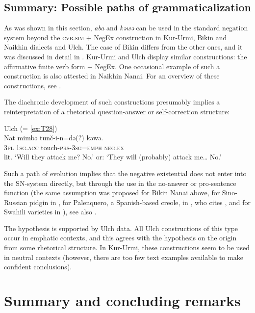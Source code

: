 \documentclass[output=paper,colorlinks,citecolor=brown]{langscibook}
\begin{document}
\subsection{Summary: Possible paths of grammaticalization}\label{sec:T6.5}

As was shown in this section, \textit{aba} and \textit{kəwə} can be used in the standard negation system beyond the \textsc{cvb.sim} + NegEx construction in Kur-Urmi, Bikin and Naikhin dialects and Ulch. The case of Bikin differs from the other ones, and it was discussed in detail in . Kur-Urmi and Ulch display similar constructions: the affirmative finite verb form + NegEx. One occasional example of such a construction is also attested in Naikhin Nanai. For an overview of these constructions, see .

The diachronic development of such constructions presumably implies a reinterpretation of a rhetorical question-answer or self-correction structure:

\ea Ulch (= \ref{ex:T28}) \label{ex:}\\
	\gll Nat	mimbə	tunč-i-n=də(?)		kəwə.\\
	\textsc{3pl}	\textsc{1sg.acc}	touch-\textsc{prs-3sg=emph}	\textsc{neg.ex}\\
	\glt lit. `Will they attack me? No.’ or: `They will (probably) attack me… No.’
\z

Such a path of evolution implies that the negative existential does not enter into the SN-system directly, but through the use in the no-answer or pro-sentence function (the same assumption was proposed for Bikin Nanai above, for Sino-Russian pidgin in \citealt[155--156]{Veselinova2016}, for Palenquero, a Spanish-based creole, in \citealt[21]{Croft1991}, who cites \citealt{Schwegler1988}, and for Swahili varieties in ), see also .

The hypothesis is supported by Ulch data. All Ulch constructions of this type occur in emphatic contexts, and this agrees with the hypothesis on the origin from some rhetorical structure. In Kur-Urmi, these constructions seem to be used in neutral contexts (however, there are too few text examples available to make confident conclusions).

\section{Summary and concluding remarks}\label{sec:T7}
\end{document}
